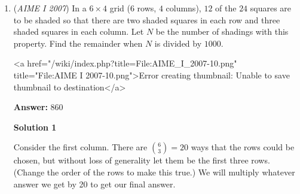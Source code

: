 \begin{enumerate}
 \textbf{Note} When drawing the diagram, it may seem that $H$ lies on circle $O_1$, but it is actually not: $H$ lies inside of circle $O_1$. We can see this from the similarity ratios: $\frac{O_1O_2}{BA}=\frac{HO_1}{CB}=\frac{HO_2}{CA}$. Taking a look at the first equation ($\frac{O_1O_2}{BA}=\frac{HO_1}{CB}$), $\frac{2r}{34}=\frac{HO_1}{16}$ which simplifies to $\frac r{17}=\frac{HO_1}{16}$. Indeed, $HO_1$ does not equal $r$, instead, $HO_1=\frac{16}{17}r$. 

 



\textbf{Solution 9}

Let the radius of the circle be $r$. It can be seen that $\Delta FHO_{1}$ and $\Delta O_{2}GJ$ are similar to $\Delta ACB$, and the length of the hypotenuses are $\frac{17}{8}r$ and $\frac {17}{15}r$, respectively. Then, the entire length of $HJ$ is going to be $(\frac{17}{8}+\frac{17}{15}+2)r = \frac{631}{120}r$. The length of the hypotenuse of $\Delta ACB$ is 34, so the length of the height to $AB$ is $\frac{16*30}{34} = \frac{240}{17}$. Thus, the height to $\Delta HCJ$ is going to be $\frac{240}{17} + r$. $\Delta HCJ$ is similar to $\Delta ACB$ so we have the following: $\frac{\frac{631}{120}r}{34} = \frac{\frac{240}{17} + r}{\frac{240}{17}}$. Cross multiplying and simplifying, we get that $r = \frac{680}{57}$ so the answer is $\boxed{737}$.~Leonard\_my\_dude~

 


 \href{https://mathproblemsolvingskills.wordpress.com/}{MathProblemSolvingSkills.com}

 


 


	\item (\textit{AIME I 2007}) In a $6 \times 4$ grid ($6$ rows, $4$ columns), $12$ of the $24$ squares are to be shaded so that there are two shaded squares in each row and three shaded squares in each column.  Let $N$ be the number of shadings with this property.  Find the remainder when $N$ is divided by $1000$.


 <a href="/wiki/index.php?title=File:AIME\_I\_2007-10.png" title="File:AIME I 2007-10.png">Error creating thumbnail: Unable to save thumbnail to destination</a>

 \textbf{Answer: }860



\textbf{Solution 1}

Consider the first column.  There are ${6\choose3} = 20$ ways that the rows could be chosen, but without loss of generality let them be the first three rows.  (Change the order of the rows to make this true.)  We will multiply whatever answer we get by 20 to get our final answer.


\end{enumerate}
